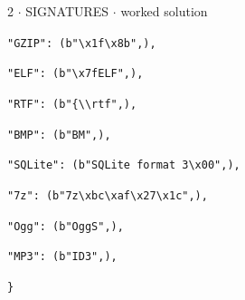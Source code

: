 \documentclass[11pt]{article}
\begin{document}
\begin{keepsection}
\begin{workedbox}{2 \ensuremath{\cdot} SIGNATURES \ensuremath{\cdot} worked solution}
\begin{enumerate}
\begin{tcolorbox}[colback=Paperblue,colframe=Paperblue,boxrule=0pt,arc=0pt,left=7pt,right=7pt,top=5pt,bottom=5pt]
\noindent\hspace*{1em}\texttt{"GZIP": (b"\textbackslash{}x1f\textbackslash{}x8b",),}\par
\noindent\hspace*{1em}\texttt{"ELF": (b"\textbackslash{}x7fELF",),}\par
\noindent\hspace*{1em}\texttt{"RTF": (b"\{\textbackslash{}\textbackslash{}rtf",),}\par
\noindent\hspace*{1em}\texttt{"BMP": (b"BM",),}\par
\noindent\hspace*{1em}\texttt{"SQLite": (b"SQLite format 3\textbackslash{}x00",),}\par
\noindent\hspace*{1em}\texttt{"7z": (b"7z\textbackslash{}xbc\textbackslash{}xaf\textbackslash{}x27\textbackslash{}x1c",),}\par
\noindent\hspace*{1em}\texttt{"Ogg": (b"OggS",),}\par
\noindent\hspace*{1em}\texttt{"MP3": (b"ID3",),}\par
\noindent\hspace*{0em}\texttt{\}}\par
\end{tcolorbox}
\end{enumerate}
\end{workedbox}

\end{keepsection}
\end{document}
